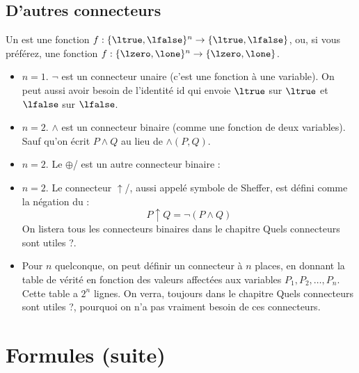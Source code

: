 \documentclass[11pt,class=report,crop=false]{standalone}
\begin{document}
\subsection{D'autres connecteurs}

Un  est une fonction $f : \{\ltrue, \lfalse\}^n \to \{\ltrue, \lfalse\}$, ou, si vous préférez, une fonction $f : \{\lzero, \lone\}^n \to \{\lzero, \lone\}$.

\begin{itemize}
	\item $n=1$. $\lnot$ est un connecteur unaire (c'est une fonction à une variable). On peut aussi avoir besoin de l'identité $\mathrm{id}$ qui envoie $\ltrue$ sur $\ltrue$ et $\lfalse$ sur $\lfalse$.
	
	\item $n=2$. $\land$ est un connecteur binaire (comme une fonction de deux variables). Sauf qu'on écrit $P \land Q$ au lieu de $\land(P, Q)$.
	
	\item $n=2$. Le  $\oplus$/ est un autre connecteur binaire :
	
	\item $n=2$. Le connecteur $\uparrow$/, aussi appelé symbole de Sheffer, est défini comme la négation du \tand :
	\[ P \uparrow Q = \lnot (P \land Q) \]
	On listera tous les connecteurs binaires dans le chapitre \og{}Quels connecteurs sont utiles ?\fg.
	
	\item Pour $n$ quelconque, on peut définir un connecteur à $n$ places, en donnant la table de vérité en fonction des valeurs affectées aux variables $P_1,P_2,\ldots, P_n$. Cette table a $2^n$ lignes.
	On verra, toujours dans le chapitre \og{}Quels connecteurs sont utiles ?\fg{}, pourquoi on n'a pas vraiment besoin de ces connecteurs.
\end{itemize}



\section{Formules (suite)}
\label{sec:formulesbis}
\end{document}
